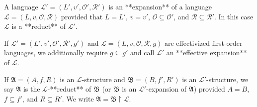 A language $\mathcal{L}' = (L', v', \mathcal{O}', \mathcal{R}')$ is an **expansion** of a language $\mathcal{L} = (L, v, \mathcal{O}, \mathcal{R})$ provided that $L = L'$, $v = v'$, $\mathcal{O} \subseteq \mathcal{O}'$, and $\mathcal{R} \subseteq \mathcal{R}'$. In this case $\mathcal{L}$ is a **reduct** of $\mathcal{L}'$.

If $\mathcal{L}' = (L', v', \mathcal{O}', \mathcal{R}', g')$ and $\mathcal{L} = (L, v, \mathcal{O}, \mathcal{R}, g)$ are effectivized first-order languages, we additionally require $g \subseteq g'$ and call $\mathcal{L}'$ an **effective expansion** of $\mathcal{L}$.

If $\mathfrak{A} = (A, f, R)$ is an $\mathcal{L}$-structure and $\mathfrak{B} = (B, f', R')$ is an $\mathcal{L}'$-structure, we say $\mathfrak{A}$ is the $\mathcal{L}$-**reduct** of $\mathfrak{B}$ (or $\mathfrak{B}$ is an $\mathcal{L}'$-expansion of $\mathfrak{A}$) provided $A = B$, $f \subseteq f'$, and $R \subseteq R'$. We write $\mathfrak{A} = \mathfrak{B} \upharpoonright \mathcal{L}$.

